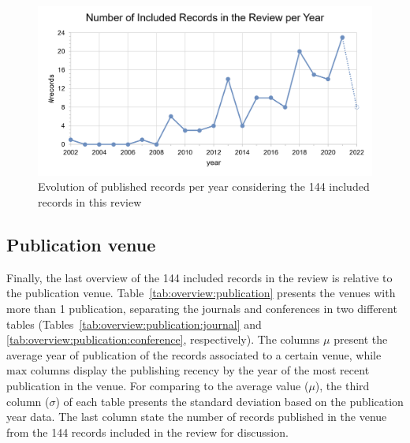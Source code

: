 \begin{figure}[!t]
  \centering
  \includegraphics[width=\columnwidth]{figures/year.png}
  \caption{Evolution of published records per year considering the 144 included records in this review}
  \label{fig:overview:year}
\end{figure}

\subsection{Publication venue}
\label{sec:overview:publication}

Finally, the last overview of the 144 included records in the review is relative to the publication venue. Table~\ref{tab:overview:publication} presents the venues with more than 1 publication, separating the journals and conferences in two different tables (Tables~\ref{tab:overview:publication:journal} and \ref{tab:overview:publication:conference}, respectively).
The columns $\mu$ present the average year of publication of the records associated to a certain venue, while $\text{max}$ columns display the publishing recency by the year of the most recent publication in the venue. For comparing to the average value ($\mu$), the third column ($\sigma$) of each table presents the standard deviation based on the publication year data.
The last column state the number of records published in the venue from the 144 records included in the review for discussion.

